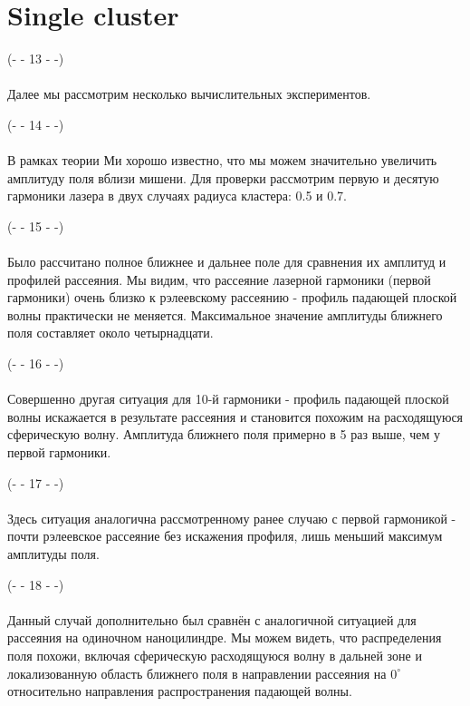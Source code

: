 \section{Single cluster}

\noindent(- - 13 - -)\\~\\

Далее мы рассмотрим несколько вычислительных экспериментов.

\noindent(- - 14 - -)\\~\\
В рамках теории Ми хорошо известно, что мы можем значительно увеличить амплитуду поля вблизи мишени. Для проверки рассмотрим первую и десятую гармоники лазера в двух случаях радиуса кластера: 0.5 и 0.7.

\noindent(- - 15 - -)\\~\\
Было рассчитано полное ближнее и дальнее поле для сравнения их амплитуд и профилей рассеяния. Мы видим, что рассеяние лазерной гармоники (первой гармоники) очень близко к рэлеевскому рассеянию - профиль падающей плоской волны практически не меняется. Максимальное значение амплитуды ближнего поля составляет около четырнадцати.

\noindent(- - 16 - -)\\~\\
Совершенно другая ситуация для 10-й гармоники - профиль падающей плоской волны искажается в результате рассеяния и становится похожим на расходящуюся сферическую волну. Амплитуда ближнего поля примерно в 5 раз выше, чем у первой гармоники. 

\noindent(- - 17 - -)\\~\\
Здесь ситуация аналогична рассмотренному ранее случаю с первой гармоникой - почти рэлеевское рассеяние без искажения профиля, лишь меньший максимум амплитуды поля.

\noindent(- - 18 - -)\\~\\
Данный случай дополнительно был сравнён с аналогичной ситуацией для рассеяния на одиночном наноцилиндре. Мы можем видеть, что распределения поля похожи, включая сферическую расходящуюся волну в дальней зоне и локализованную область ближнего поля в направлении рассеяния на $0^{\circ}$ относительно направления распространения падающей волны.